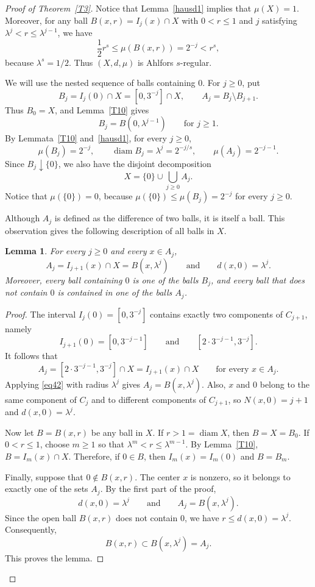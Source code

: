 \documentclass[12pt,leqno]{amsart}
\newtheorem{lemma}[theorem]{Lemma}
\theoremstyle{definition}
\def\diam{\operatorname{diam}}
\numberwithin{theorem}{section} \numberwithin{equation}{section}
\begin{document}
\begin{proof}[Proof of Theorem~\ref{T3}]
Notice that Lemma~\ref{hausd1} implies that $\mu(X)=1$. Moreover, for any ball $B(x,r)=I_j(x)\cap X$ with $0<r\leq1$ and $j$ satisfying $\lambda^j<r\leq\lambda^{j-1}$, we have
\[
\frac12 r^s\leq\mu(B(x,r))=2^{-j}<r^s,
\]
because $\lambda^s=1/2$. Thus $(X,d,\mu)$ is Ahlfors $s$-regular.

We will use the nested sequence of balls containing $0$. For $j\geq0$, put
\[
B_j=I_j(0)\cap X=[0,3^{-j}]\cap X,
\qquad
A_j=B_j\setminus B_{j+1}.
\]
Thus $B_0=X$, and Lemma~\ref{T10} gives
\[
B_j=B(0,\lambda^{j-1})
\qquad\text{for }j\geq1.
\]
By Lemmata~\ref{T10} and~\ref{hausd1}, for every $j\geq0$,
\begin{equation}
\label{eq44}
\mu(B_j)=2^{-j},\qquad \diam B_j =\lambda^j=2^{-j/s},\qquad \mu(A_j)=2^{-j-1}.
\end{equation}
Since $B_j\downarrow\{0\}$, we also have the disjoint decomposition
\[
X=\{0\}\cup\bigcup_{j\geq0}A_j.
\]
Notice that $\mu(\{0\})=0$, because $\mu(\{0\})\leq\mu(B_j)=2^{-j}$ for every $j\geq0$.

Although $A_j$ is defined as the difference of two balls, it is itself a ball. This observation gives the following description of all balls in $X$.
\begin{lemma}
\label{T8}
For every $j\geq0$ and every $x\in A_j$,
\[
A_j=I_{j+1}(x)\cap X=B(x,\lambda^j)
\qquad\text{and}\qquad
d(x,0)=\lambda^j.
\]
Moreover, every ball containing $0$ is one of the balls $B_j$, and every ball that does not contain $0$ is contained in one of the balls $A_j$.
\end{lemma}
\begin{proof}
The interval $I_j(0)=[0,3^{-j}]$ contains exactly two components of $C_{j+1}$, namely
\[
I_{j+1}(0)=[0,3^{-j-1}]
\qquad\text{and}\qquad
[2\cdot3^{-j-1},3^{-j}].
\]
It follows that
\[
A_j=[2\cdot3^{-j-1},3^{-j}]\cap X=I_{j+1}(x)\cap X
\qquad\text{for every }x\in A_j.
\]
Applying \eqref{eq42} with radius $\lambda^j$ gives $A_j=B(x,\lambda^j)$. Also, $x$ and $0$ belong to the same component of $C_j$ and to different components of $C_{j+1}$, so $N(x,0)=j+1$ and $d(x,0)=\lambda^j$.

Now let $B=B(x,r)$ be any ball in $X$. If $r>1=\diam X$, then $B=X=B_0$. If $0<r\leq1$, choose $m\geq1$ so that $\lambda^m<r\leq\lambda^{m-1}$. By Lemma~\ref{T10}, $B=I_m(x)\cap X$. Therefore, if $0\in B$, then $I_m(x)=I_m(0)$ and $B=B_m$.

Finally, suppose that $0\notin B(x,r)$. The center $x$ is nonzero, so it belongs to exactly one of the sets $A_j$. By the first part of the proof,
\[
d(x,0)=\lambda^j
\qquad\text{and}\qquad
A_j=B(x,\lambda^j).
\]
Since the open ball $B(x,r)$ does not contain $0$, we have $r\leq d(x,0)=\lambda^j$. Consequently,
\[
B(x,r)\subset B(x,\lambda^j)=A_j.
\]
This proves the lemma.
\end{proof}


\end{proof}
\end{document}
